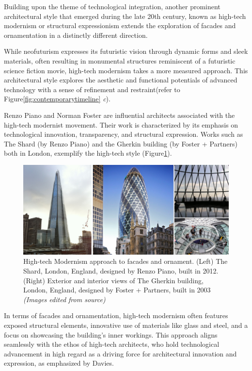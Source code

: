 
Building upon the theme of technological integration, another prominent architectural style that emerged during the late 20th century, known as high-tech modernism or structural expressionism extends the exploration of facades and ornamentation in a distinctly different direction.

While neofuturism expresses its futuristic vision through dynamic forms and sleek materials, often resulting in monumental structures reminiscent of a futuristic science fiction movie, high-tech modernism takes a more measured approach.
This architectural style explores the aesthetic and functional potentials of advanced technology with a sense of refinement and restraint(refer to Figure\ref{fig:contemporarytimeline} \textit{c}).

Renzo Piano and Norman Foster are influential architects associated with the high-tech modernist movement\cite{Tyc2018}.
Their work is characterized by its emphasis on technological innovation, transparency, and structural expression.
Works such as The Shard (by Renzo Piano) and the Gherkin building (by Foster + Partners) both in London, exemplify the high-tech style (Figure\ref{fig:hightechmodernism}).

     \begin{figure}[htb]
          \centering
          \includegraphics[width= \linewidth]{Images/hightechmodernism}
          \caption{High-tech Modernism approach to facades and ornament. (Left) The Shard, London, England, designed by Renzo Piano, built in 2012. (Right) Exterior and interior views of The Gherkin building, London, England, designed by  Foster + Partners, built in 2003 \textit{(Images edited from source)}}
          \label{fig:hightechmodernism}
        \end{figure}

In terms of facades and ornamentation, high-tech modernism often features exposed structural elements, innovative use of materials like glass and steel, and a focus on showcasing the building's inner workings.
This approach aligns seamlessly with the ethos of high-tech architects, who hold technological advancement in high regard as a driving force for architectural innovation and expression, as emphasized by Davies\cite{Davies1988}.

